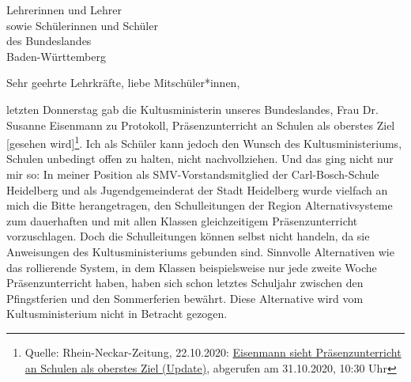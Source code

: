 \documentclass[
	fontsize=12pt,
	parskip=full,
	paper=A4,	
	fromalign=right,
	fromemail=true,
	version=last,
]{scrlttr2}
\begin{document}
\begin{letter}{
	Lehrerinnen und Lehrer\\
	sowie Schülerinnen und Schüler\\
	des Bundeslandes\\
	Baden-Württemberg
}

\opening{Sehr geehrte Lehrkräfte, liebe Mitschüler*innen,}

letzten Donnerstag gab die Kultusministerin unseres Bundeslandes, Frau Dr. Susanne Eisenmann zu Protokoll, \glqq [dass] Präsenz\-unterricht an Schulen als oberstes Ziel [gesehen wird]\grqq{}\footnote{Quelle: Rhein-Neckar-Zeitung, 22.10.2020: \href{https://www.rnz.de/politik/suedwest_artikel,-baden-wuerttemberg-eisenmann-sieht-praesenzunterricht-an-schulen-als-oberstes-ziel-update-_arid,568110.html}{\color{blue}Eisenmann sieht Präsenzunterricht an Schulen als oberstes Ziel (Update)}, abgerufen am 31.10.2020, 10:30 Uhr}. Ich als Schüler kann jedoch den Wunsch des Kultusministeriums, Schulen unbedingt offen zu halten, nicht nachvollziehen. Und das ging nicht nur mir so: In meiner Position als SMV-Vorstandsmitglied der Carl-Bosch-Schule Heidelberg und als Jugendgemeinderat der Stadt Heidelberg wurde vielfach an mich die Bitte herangetragen, den Schulleitungen der Region Alternativsysteme zum dauerhaften und mit allen Klassen gleichzeitigem Präsenz\-unterricht vorzuschlagen. Doch die Schulleitungen können selbst nicht handeln, da sie Anweisungen des Kultusministeriums gebunden sind. Sinnvolle Alternativen wie das rollierende System, in dem Klassen beispielsweise nur jede zweite Woche Präsenz\-unterricht haben, haben sich schon letztes Schuljahr zwischen den Pfingstferien und den Sommerferien bewährt. Diese Alternative wird vom Kultusministerium nicht in Betracht gezogen.


\end{letter}
\end{document}
